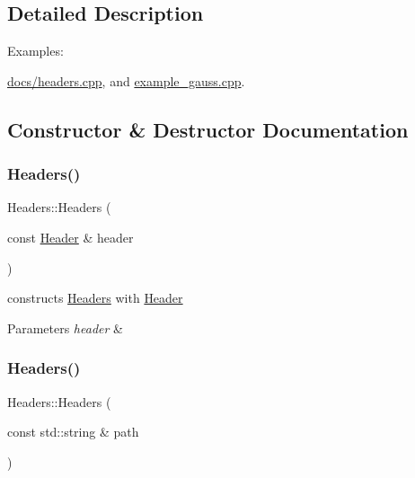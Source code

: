 \subsection{Detailed Description}
\begin{Desc}
\item[Examples\+: ]\par
\hyperlink{docs_2headers_8cpp-example}{docs/headers.\+cpp}, and \hyperlink{example_gauss_8cpp-example}{example\+\_\+gauss.\+cpp}.\end{Desc}


\subsection{Constructor \& Destructor Documentation}
\mbox{\label{classyacx_1_1_headers_ae04c7a09aac2e2417c7f5cb3410b011f}} 
\subsubsection{\texorpdfstring{Headers()}{Headers()}\hspace{0.1cm}{\footnotesize\ttfamily [1/4]}}
{\footnotesize\ttfamily Headers\+::\+Headers (\begin{DoxyParamCaption}\item[{const \hyperlink{classyacx_1_1_header}{Header} \&}]{header }\end{DoxyParamCaption})\hspace{0.3cm}{\ttfamily [explicit]}}

constructs \hyperlink{classyacx_1_1_headers}{Headers} with \hyperlink{classyacx_1_1_header}{Header} 
\begin{DoxyParams}{Parameters}
{\em header} & \\
\hline
\end{DoxyParams}
\mbox{\label{classyacx_1_1_headers_af379ab4de8a97b9af8eff850987ce1d5}} 
\subsubsection{\texorpdfstring{Headers()}{Headers()}\hspace{0.1cm}{\footnotesize\ttfamily [2/4]}}
{\footnotesize\ttfamily Headers\+::\+Headers (\begin{DoxyParamCaption}\item[{const std\+::string \&}]{path }\end{DoxyParamCaption})\hspace{0.3cm}{\ttfamily [explicit]}}

